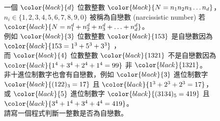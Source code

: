 一個 $\color{black}{d}$ 位數整數 $\color{black}{N = n_1 n_2 n_3 \ldots n_d}$， ${n_i} \in \{1, 2, 3, 4, 5, 6, 7, 8, 9, 0\}$ 被稱為自戀數 (narcissistic number) 若 $\color{black}{N = n_1^d + n_2^d + n_3^d + \ldots + n_d^d}$。\\
例如 $\color{black}{3}$ 位數整數 $\color{black}{153}$ 是自戀數因為 $\color{black}{153 = 1 ^ 3 + 5 ^ 3 + 3 ^ 3}$ ，\\
而 $\color{black}{4}$ 位數整數 $\color{black}{1321}$ 不是自戀數因為 $\color{black}{1^4 + 3 ^ 4 + 2 ^ 4 + 1 ^ 4 = 99}$ 非 $\color{black}{1321}$。\\
非十進位制數字也會有自戀數，例如 $\color{black}{3}$ 進位制數字 $\color{black}{(122)_3 = 17}$ 且 $\color{black}{1^3 + 2 ^ 3 + 2 ^ 3 = 17}$，\\
或 $\color{black}{5}$ 進位制數字 $\color{black}{(3134)_5 = 419}$ 且 $\color{black}{3^4 + 1^4 + 3^4 + 4^4 = 419}$。\\
請寫一個程式判斷一整數是否為自戀數。\\
